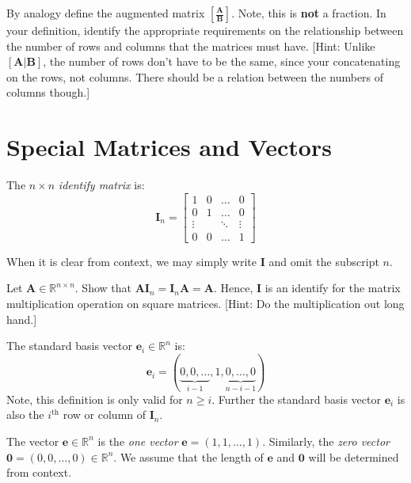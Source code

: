 \begin{exercise} By analogy define the augmented matrix $\left[\frac{\mathbf{A}}{\mathbf{B}}\right]$. Note, this is \textbf{not} a fraction. In your definition, identify the appropriate requirements on the relationship between the number of rows and columns that the matrices must have. [Hint: Unlike $\left[\mathbf{A}|\mathbf{B}\right]$, the number of rows don't have to be the same, since your concatenating on the rows, not columns. There should be a relation between the numbers of columns though.]
\end{exercise}

\section{Special Matrices and Vectors}
\begin{definition} The $n \times n$ \textit{identify matrix} is:
\begin{equation}
\mathbf{I}_n = 
\left[
\begin{array}{cccc}
1 & 0 & \dots & 0\\
0 & 1 & \dots & 0\\
\vdots & & \ddots & \vdots\\
0 & 0 & \dots & 1
\end{array}\right]
\end{equation}
\end{definition}
When it is clear from context, we may simply write $\mathbf{I}$ and omit the subscript $n$. 
\begin{exercise} Let $\mathbf{A} \in \mathbb{R}^{n \times n}$. Show that $\mathbf{A}\mathbf{I}_n = \mathbf{I}_n\mathbf{A} = \mathbf{A}$. Hence, $\mathbf{I}$ is an identify for the matrix multiplication operation on square matrices. [Hint: Do the multiplication out long hand.]
\end{exercise}
\begin{definition} The standard basis vector $\mathbf{e}_i \in \mathbb{R}^n$ is:
\begin{displaymath}
\mathbf{e}_i = \left(\underset{i-1}{\underbrace{0,0,\dots}},1,
\underset{n-i-1}{\underbrace{0,\dots,0}}\right)
\end{displaymath}
Note, this definition is only valid for $n \geq i$. Further the standard basis vector $\mathbf{e}_i$ is also the $i^{\text{th}}$ row or column of $\mathbf{I}_n$. 
\end{definition}

\begin{definition} The vector $\mathbf{e} \in \mathbb{R}^n$ is the \textit{one vector} $\mathbf{e} = (1,1,\dots,1)$. Similarly, the \textit{zero vector} $\mathbf{0} = (0,0,\dots,0) \in \mathbb{R}^n$. We assume that the length of $\mathbf{e}$ and $\mathbf{0}$ will be determined from context. 
\end{definition}


